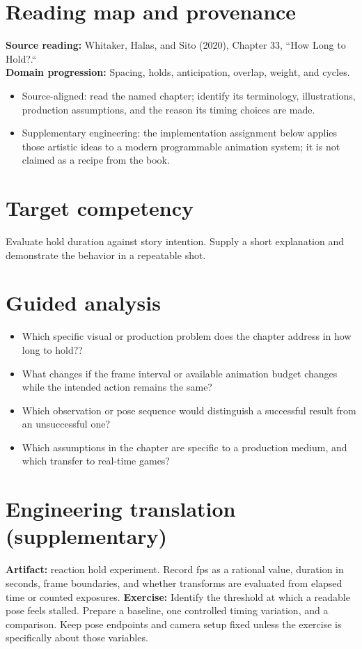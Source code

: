\documentclass[10pt,letterpaper]{article}
\begin{document}
\makedoctitle
\makedocsummary

\section{Reading map and provenance}
\textbf{Source reading:} Whitaker, Halas, and Sito (2020), Chapter 33, ``How Long to Hold?.``\\
\textbf{Domain progression:} Spacing, holds, anticipation, overlap, weight, and cycles.
\begin{itemize}
\item Source-aligned: read the named chapter; identify its terminology, illustrations, production assumptions, and the reason its timing choices are made.
\item Supplementary engineering: the implementation assignment below applies those artistic ideas to a modern programmable animation system; it is not claimed as a recipe from the book.
\end{itemize}
\section{Target competency}
Evaluate hold duration against story intention. Supply a short explanation and demonstrate the behavior in a repeatable shot.
\section{Guided analysis}
\begin{itemize}
\item Which specific visual or production problem does the chapter address in how long to hold??
\item What changes if the frame interval or available animation budget changes while the intended action remains the same?
\item Which observation or pose sequence would distinguish a successful result from an unsuccessful one?
\item Which assumptions in the chapter are specific to a production medium, and which transfer to real-time games?
\end{itemize}
\section{Engineering translation (supplementary)}
\textbf{Artifact:} reaction hold experiment. Record fps as a rational value, duration in seconds, frame boundaries, and whether transforms are evaluated from elapsed time or counted exposures.
\textbf{Exercise:} Identify the threshold at which a readable pose feels stalled. Prepare a baseline, one controlled timing variation, and a comparison. Keep pose endpoints and camera setup fixed unless the exercise is specifically about those variables.
\end{document}
